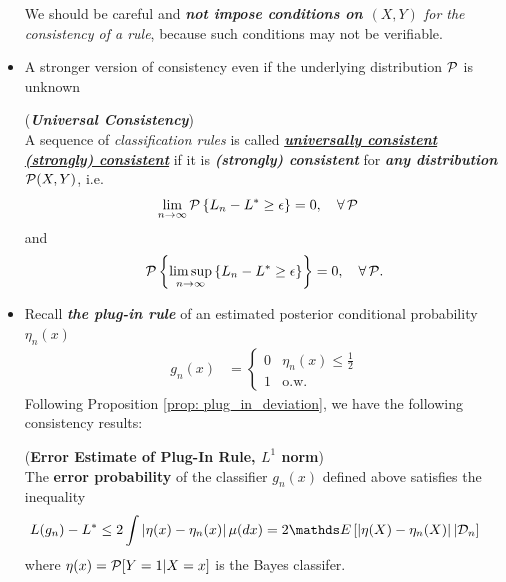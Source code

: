 \documentclass[11pt]{article}
\begin{document}
\begin{itemize}
\begin{remark}
We should be careful and \emph{\textbf{not impose conditions on $(X, Y)$} for the consistency of a rule}, because such conditions may not be verifiable. 
\end{remark}


\item A stronger version of consistency even if  the underlying distribution ${\mathcal P}$ is unknown
\begin{definition} (\emph{\textbf{Universal Consistency}})\\
A sequence of \emph{classification rules} is called \underline{\emph{\textbf{universally consistent (strongly) consistent}}} if it is \emph{\textbf{(strongly) consistent}} for \emph{\textbf{any distribution}} ${\mathcal P}(X,Y)$, i.e. 
\begin{align*}
\lim\limits_{n\rightarrow \infty}{\mathcal P}\left\{ L_{n}  - L^{*}\ge \epsilon \right\}&= 0, \quad \forall\, {\mathcal P} 
\end{align*}
and 
\begin{align*}
{\mathcal P}\left\{ \limsup\limits_{n\rightarrow \infty}\left\{L_{n} - L^{*}\ge \epsilon \right\}\right\} = 0, \quad \forall\, {\mathcal P}.
\end{align*}
\end{definition}

\item Recall \emph{\textbf{the plug-in rule}} of an estimated posterior conditional probability $\eta_n(x)$
\begin{align*}
g_n(x) &= \left\{ \begin{array}{cc}
0 & \eta_n(x) \le \frac{1}{2}\\
1 & \text{o.w.}
\end{array}
\right.
\end{align*} Following Proposition \ref{prop: plug_in_deviation}, we have the following consistency results:
\begin{remark} (\textbf{Error Estimate of Plug-In Rule, $L^1$ norm}) \citep{devroye2013probabilistic} \\
The \textbf{error probability} of the classifier $g_n(x)$ defined above satisfies the inequality
\begin{align*}
L(g_n) - L^{*} &\le 2 \int \abs{\eta(x) - \eta_n(x)} \mu(dx) =2 \E{}{\abs{\eta(X) - \eta_n(X)}| \cD_n} \
\end{align*} where $\eta(x) = {\mathcal P}[Y =  1| X=x]$ is the Bayes classifer.
\end{remark}


\end{itemize}
\end{document}
